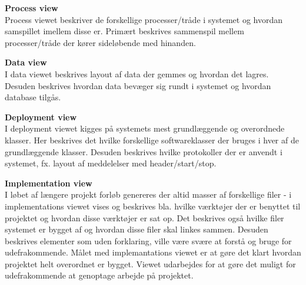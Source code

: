 \textbf{Process view}\\
Process viewet beskriver de forskellige processer/tråde i systemet og hvordan samspillet imellem disse er. Primært beskrives sammenspil mellem processer/tråde der kører sideløbende med hinanden.

\textbf{Data view}\\
I data viewet beskrives layout af data der gemmes og hvordan det lagres. Desuden beskrives hvordan data bevæger sig rundt i systemet og hvordan database tilgås. 

\textbf{Deployment view}\\
I deployment viewet kigges på systemets mest grundlæggende og overordnede klasser. Her beskrives det hvilke forskellige softwareklasser der bruges i hver af de grundlæggende klasser. Desuden beskrives hvilke protokoller der er anvendt i systemet, fx. layout af meddelelser med header/start/stop.   

\textbf{Implementation view}\\
I løbet af længere projekt forløb genereres der altid masser af forskellige filer - i implementations viewet vises og beskrives bla. hvilke værktøjer der er benyttet til projektet og hvordan disse værktøjer er sat op. Det beskrives også hvilke filer systemet er bygget af og hvordan disse filer skal linkes sammen. Desuden beskrives elementer som uden forklaring, ville være svære at forstå og bruge for udefrakommende. Målet med implemantations viewet er at gøre det klart hvordan projektet helt overordnet er bygget. Viewet udarbejdes for at gøre det muligt for udefrakommende at genoptage arbejde på projektet.


